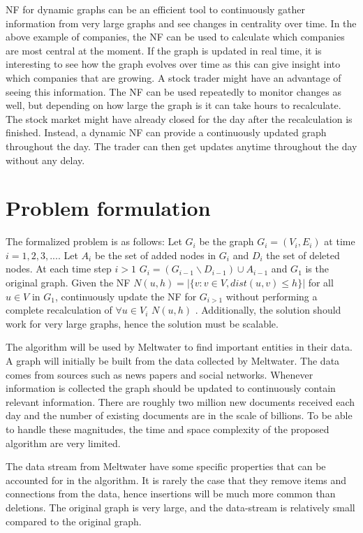 NF for dynamic graphs can be an efficient tool to continuously gather information from very large graphs and see changes in centrality over time. In the above example of companies, the NF can be used to calculate which companies are most central at the moment. If the graph is updated in real time, it is interesting to see how the graph evolves over time as this can give insight into which companies that are growing. A stock trader might have an advantage of seeing this information. The NF can be used repeatedly to monitor changes as well, but depending on how large the graph is it can take hours to recalculate. The stock market might have already closed for the day after the recalculation is finished. Instead, a dynamic NF can provide a continuously updated graph throughout the day. The trader can then get updates anytime throughout the day without any delay.

\section{Problem formulation}
The formalized problem is as follows: 
Let $G_i$ be the graph $G_i = (V_i,E_i)$ at time $i = 1,2,3,...$.
Let $A_i$ be the set of added nodes in $G_i$ and $D_i$ the set of deleted nodes. 
At each time step $i > 1$ $G_i = (G_{i-1} \backslash D_{i-1}) \cup A_{i-1}$ and $G_1$ is the original graph. Given the NF $N(u, h) = |\{v : v \in V, dist(u,v) \leq h \}|$ for all $u \in V$ in $G_1$, continuously update the NF for $G_{i>1}$ without performing a complete recalculation of $\forall u \in V_i$ $N(u, h)$ . Additionally, the solution should work for very large graphs, hence the solution must be scalable. 

The algorithm will be used by Meltwater to find important entities in their data. A graph will initially be built from the data collected by Meltwater. The data comes from sources such as news papers and social networks. Whenever information is collected the graph should be updated to continuously contain relevant information. There are roughly two million new documents received each day and the number of existing documents are in the scale of billions. To be able to handle these magnitudes, the time and space complexity of the proposed algorithm are very limited.

The data stream from Meltwater have some specific properties that can be accounted for in the algorithm. It is rarely the case that they remove items and connections from the data, hence insertions will be much more common than deletions. The original graph is very large, and the data-stream is relatively small compared to the original graph. 

